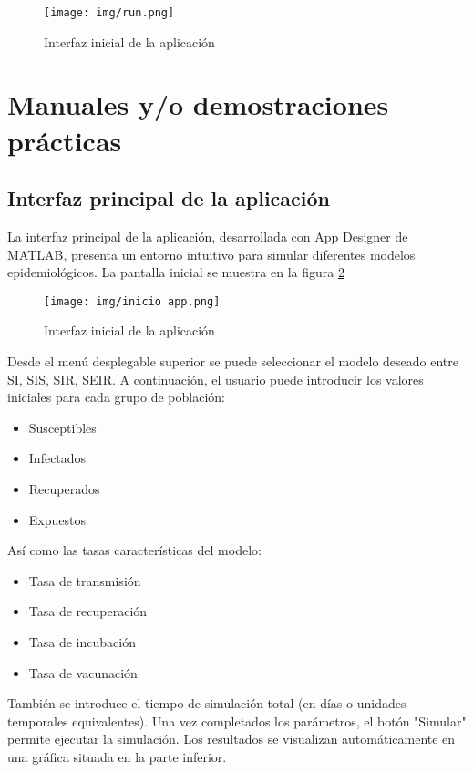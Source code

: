 \begin{enumerate}
    \begin{figure}[H]
        \centering
        \texttt{[image: img/run.png]}
        \caption{Interfaz inicial de la aplicación}
        \label{fig:app run}
        \vspace{0.5cm} %
    \end{figure}
\end{enumerate}



\section{Manuales y/o demostraciones prácticas}
\subsection{Interfaz principal de la aplicación}
La interfaz principal de la aplicación, desarrollada con App Designer de MATLAB, presenta un entorno intuitivo para simular diferentes modelos epidemiológicos. La pantalla inicial se muestra en la figura \ref{fig:app inicio}


\begin{figure}[H]
        \centering
        \texttt{[image: img/inicio app.png]}
        \caption{Interfaz inicial de la aplicación}
        \label{fig:app inicio}
        \vspace{0.5cm} %
    \end{figure}

Desde el menú desplegable superior se puede seleccionar el modelo deseado entre SI, SIS, SIR, SEIR. A continuación, el usuario puede introducir los valores iniciales para cada grupo de población:
\begin{itemize}
    \item Susceptibles
    \item Infectados
    \item Recuperados
    \item Expuestos
\end{itemize}
Así como las tasas características del modelo:
\begin{itemize}
    \item Tasa de transmisión
    \item Tasa de recuperación
    \item Tasa de incubación
    \item Tasa de vacunación
\end{itemize}
También se introduce el tiempo de simulación total (en días o unidades temporales equivalentes). Una vez completados los parámetros, el botón "Simular" permite ejecutar la simulación. Los resultados se visualizan automáticamente en una gráfica situada en la parte inferior.

